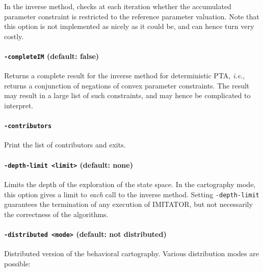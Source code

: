 \documentclass[a4paper,11pt]{report}
\newcommand{\imitator}{\textsf{IMITATOR}}
\newcommand{\styleOption}[1]{\textcolor{optioncolor}{\texttt{#1}}}
\newcommand{\ie}{\textcolor{colorok}{\textit{i.e.}, }}
\begin{document}
In the inverse method, checks at each iteration whether the accumulated parameter constraint is restricted to the reference parameter valuation.
Note that this option is not implemented as nicely as it could be, and can hence turn very costly.


\paragraph{\styleOption{-completeIM} (default: false)}

Returns a complete result for the inverse method for deterministic PTA, \ie{} returns a conjunction of negations of convex parameter constraints.
The result may result in a large list of such constraints, and may hence be complicated to interpret.


\paragraph{\styleOption{-contributors}}
Print the list of contributors and exits.


\paragraph{\styleOption{-depth-limit <limit>} (default: none)}
Limits the depth of the exploration of the state space.
In the cartography mode, this option gives a limit to \emph{each} call to the inverse method.
Setting \styleOption{-depth-limit} guarantees the termination of any execution of \imitator{}, but not necessarily the correctness of the algorithms.


\paragraph{\styleOption{-distributed <mode>} (default: not distributed)}
Distributed version of the behavioral cartography.
Various distribution modes are possible:
\end{document}
